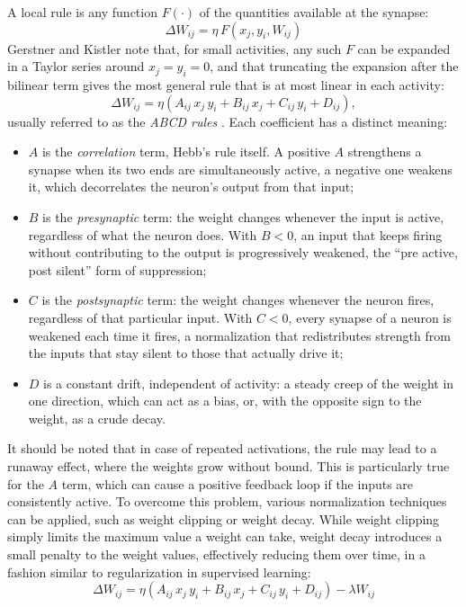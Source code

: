 A local rule is any function $F(\cdot)$ of the quantities available at the synapse:
\[\Delta W_{ij} = \eta\, F(x_j, y_i, W_{ij})\]
 Gerstner and Kistler \cite{gerstner2002mathematical} note that, for small activities, any such $F$ can be expanded in a Taylor series around $x_j = y_i = 0$, and that truncating the expansion after the bilinear term gives the most general rule that is at most linear in each activity:
\begin{equation}
\Delta W_{ij} = \eta \left( A_{ij}\, x_j\, y_i + B_{ij}\, x_j + C_{ij}\, y_i + D_{ij} \right),
\label{eq:abcd}
\end{equation}
usually referred to as the \emph{ABCD rules} \cite{niv2002evolution, soltoggio2008evolutionary}. Each coefficient has a distinct meaning:
\begin{itemize}
    \item $A$ is the \emph{correlation} term, Hebb's rule itself. A positive $A$ strengthens a synapse when its two ends are simultaneously active, a negative one weakens it, which decorrelates the neuron's output from that input;
    \item $B$ is the \emph{presynaptic} term: the weight changes whenever the input is active, regardless of what the neuron does. With $B < 0$, an input that keeps firing without contributing to the output is progressively weakened, the ``pre active, post silent'' form of suppression;
    \item $C$ is the \emph{postsynaptic} term: the weight changes whenever the neuron fires, regardless of that particular input. With $C < 0$, every synapse of a neuron is weakened each time it fires, a normalization that redistributes strength from the inputs that stay silent to those that actually drive it;
    \item $D$ is a constant drift, independent of activity: a steady creep of the weight in one direction, which can act as a bias, or, with the opposite sign to the weight, as a crude decay.
\end{itemize}



It should be noted that in case of repeated activations, the rule may lead to a runaway effect, where the weights grow without bound. This is particularly true for the $A$ term, which can cause a positive feedback loop if the inputs are consistently active. To overcome this problem, various normalization techniques can be applied, such as weight clipping or weight decay. While weight clipping simply limits the maximum value a weight can take, weight decay introduces a small penalty to the weight values, effectively reducing them over time, in a fashion similar to regularization in supervised learning:
\[\Delta W_{ij} = \eta \left( A_{ij}\, x_j\, y_i + B_{ij}\, x_j + C_{ij}\, y_i + D_{ij} \right) - \lambda W_{ij}\]

